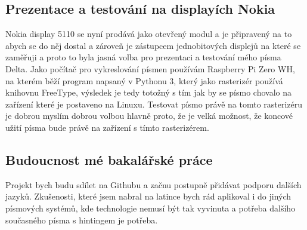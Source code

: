 \documentclass[a4paper]{article}
\begin{document}
\subsection{Prezentace a testování na displayích Nokia}
Nokia display 5110 se nyní prodává jako otevřený modul a je připravený na to abych se do něj dostal a zároveň je zástupcem jednobitových displejů na které se zaměřuji a proto to byla jasná volba pro prezentaci a testování mého písma Delta. Jako počítač pro vykreslování písmen používám Raspberry Pi Zero WH, na kterém běží program napsaný v Pythonu 3, který jako rasterizér používá knihovnu FreeType, výsledek je tedy totožný s tím jak by se písmo chovalo na zařízení které je postaveno na Linuxu. Testovat písmo právě na tomto rasterizéru je dobrou myslím dobrou volbou hlavně proto, že je velká možnost, že koncové užití písma bude právě na zařízení s tímto rasterizérem.
\subsection{Budoucnost mé bakalářské práce}
Projekt bych budu sdílet na Githubu a začnu postupně přidávat podporu dalších jazyků. Zkušenosti, které jsem nabral na latince bych rád aplikoval i do jiných písmových systémů, kde technologie nemusí být tak vyvinuta a potřeba dalšího současného písma s hintingem je potřeba.
\end{document}
